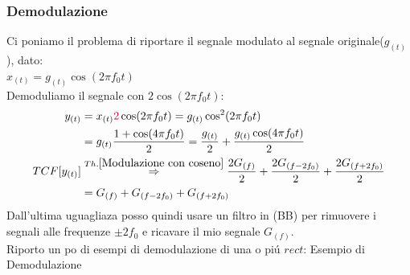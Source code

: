             \subsubsection{Demodulazione}\label{Demodulazione}
            Ci poniamo il problema di riportare il segnale modulato al segnale originale($g_{(t)}$), dato:\\
            $x_{(t)} = g_{(t)} \cos(2\pi f_0t)$\\
            Demoduliamo il segnale con $2\cos(2\pi f_0t)$:
            \begin{align}
                y_{(t)} &= x_{(t)} {\color{purple}2}\cos(2\pi f_0t) = g_{(t)} \cos^2(2\pi f_0t) \nonumber \\
                        &= g_{(t)} \frac{1+ \cos(4\pi f_0t)}{2} = \frac{g_{(t)}}{2} + \frac{g_{(t)}\cos(4\pi f_0t)}{2}\nonumber\\
                TCF[y_{(t)}] &\overset{Th. \ref{Modulazione con coseno}}{\Rightarrow}  \frac{2G_{(f)}}{2} + \frac{2G_{(f-2f_0)}}{2}+ \frac{2G_{(f+2f_0)}}{2} \nonumber \\
                        &= G_{(f)}+G_{(f-2f_0)}+G_{(f+2f_0)}
            \end{align}
            Dall'ultima uguagliaza posso quindi usare un filtro in ({\color{blue}BB}) per rimuovere i segnali alle frequenze $\pm 2f_0$ e ricavare il mio segnale $G_{(f)}$.\\
            Riporto un po di esempi di demodulazione di una o piú $rect$:
            Esempio di Demodulazione
